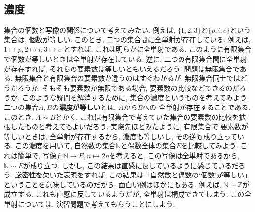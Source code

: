     \subsection{濃度}
            集合の個数と写像の関係について考えてみたい. 例えば, $\{1,2,3\}$と$\{p,i,e\}$という集合は, 個数が等しい. このとき, 二つの集合間に全単射が存在している. 例えば, $1\mapsto p,2\mapsto i,3\mapsto e$
            とすれば, これは明らかに全単射である. このように有限集合で個数が等しいときは全単射が存在している. 逆に, 二つの有限集合間に全単射が存在すれば, それらの要素数は等しいともいえるだろう.
            問題は無限集合である. 無限集合と有限集合の要素数が違うのはすぐわかるが, 無限集合同士ではどうだろうか. そもそも要素数が無限である場合, 要素数の比較などできるのだろうか.
            このような疑問を解消するために, 集合の濃度というものを考えてみよう. 二つの集合$A,B$の\textbf{濃度が等しい}とは, $A$から$B$への
            全単射が存在することである. このとき, $A\sim B$とかく. これは有限集合で考えていた集合の要素数の比較を拡張したものと考えてもよいだろう. 実際先ほどみたように, 有限集合で
            要素数が等しいときは, 全単射が存在するから, 濃度も等しいし, その逆も成り立っている. この濃度を用いて, 自然数の集合$\mathbb{N}$と偶数全体の集合$E$を比較してみよう.
            これは簡単で, 写像$f:\mathbb{N}\rightarrow E,n\mapsto 2n$を考えると, この写像は全単射であるから, $\mathbb{N}\sim E$が成り立つ. しかし, この結果は直感に反しているように感じているだろう.
            厳密性を欠いた表現をすれば, この結果は「自然数と偶数の`個数'が等しい」ということを意味しているのだから. 面白い例はほかにもある. 例えば, $\mathbb{N}\sim\mathbb{Z}$が成立する.
            これも直感に反しているようだが, 全単射は構成できてしまう. この全単射については, 演習問題で考えてもらうことにしよう.

